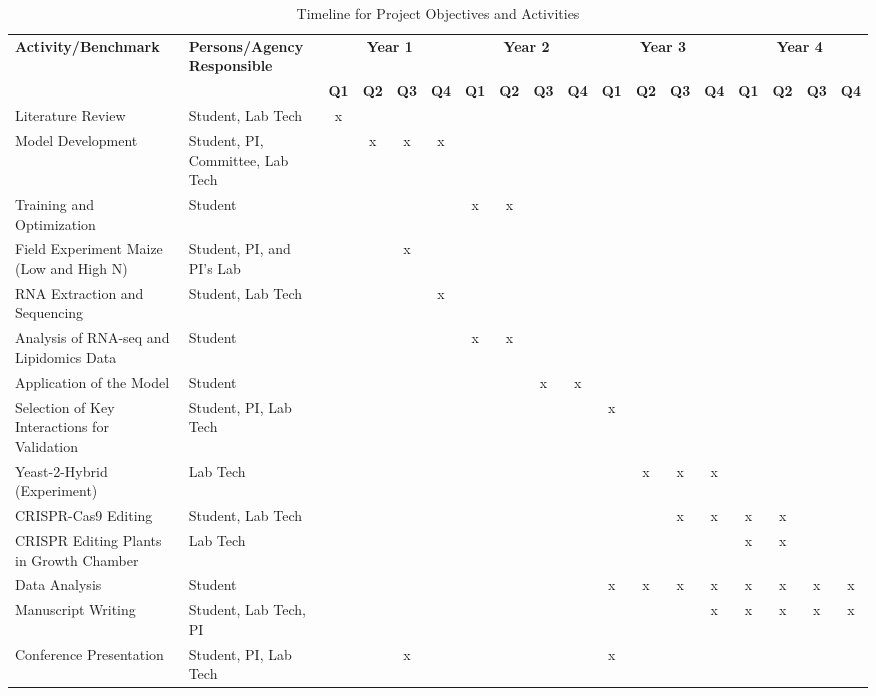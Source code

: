 \documentclass{article}
\begin{document}
\begin{landscape} %

\renewcommand{\arraystretch}{1.3}
\setlength{\tabcolsep}{5pt}

\begin{longtable}{|p{6.5cm}|p{5cm}|*{16}{c|}}
\caption{Timeline for Project Objectives and Activities}\label{tab:timeline} \\
\hline
\textbf{Activity/Benchmark} & \textbf{Persons/Agency Responsible} & \multicolumn{4}{c|}{\textbf{Year 1}} & \multicolumn{4}{c|}{\textbf{Year 2}} & \multicolumn{4}{c|}{\textbf{Year 3}} & \multicolumn{4}{c|}{\textbf{Year 4}} \\
\cline{3-18}
& & \textbf{Q1} & \textbf{Q2} & \textbf{Q3} & \textbf{Q4} & \textbf{Q1} & \textbf{Q2} & \textbf{Q3} & \textbf{Q4} & \textbf{Q1} & \textbf{Q2} & \textbf{Q3} & \textbf{Q4} & \textbf{Q1} & \textbf{Q2} & \textbf{Q3} & \textbf{Q4} \\
\hline
Literature Review & Student, Lab Tech & x & & & & & & & & & & & & & & & \\
\hline
Model Development & Student, PI, Committee, Lab Tech & & x & x & x & & & & & & & & & & & & \\
\hline
Training and Optimization & Student & & & & & x & x & & & & & & & & & & \\
\hline
Field Experiment Maize (Low and High N) & Student, PI, and PI's Lab & & & x & & & & & & & & & & & & & \\
\hline
RNA Extraction and Sequencing & Student, Lab Tech & & & & x & & & & & & & & & & & & \\
\hline
Analysis of RNA-seq and Lipidomics Data & Student & & & & & x & x & & & & & & & & & & \\
\hline
Application of the Model & Student & & & & & & & x & x & & & & & & & & \\
\hline
Selection of Key Interactions for Validation & Student, PI, Lab Tech & & & & & & & & & x & & & & & & & \\
\hline
Yeast-2-Hybrid (Experiment) & Lab Tech & & & & & & & & & & x & x & x & & & & \\
\hline
CRISPR-Cas9 Editing & Student, Lab Tech & & & & & & & & & & & x & x & x & x & & \\
\hline
CRISPR Editing Plants in Growth Chamber & Lab Tech & & & & & & & & & & & & & x & x & & \\
\hline
Data Analysis & Student & & & & & & & & & x & x & x & x & x & x & x & x \\
\hline
Manuscript Writing & Student, Lab Tech, PI & & & & & & & & & & & & x & x & x & x & x \\
\hline
Conference Presentation & Student, PI, Lab Tech & & & x & & & & & & x & & & & & & & \\
\hline
\end{longtable}

\end{landscape} %
\end{document}
